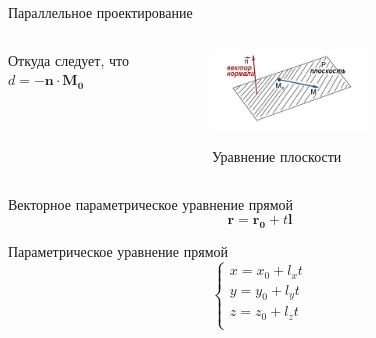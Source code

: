 \documentclass{beamer}
\begin{document}
\begin{frame}{Параллельное проектирование}
{\begin{columns}
\begin{column}{0.5\textwidth}
							Откуда следует, что
							$
								d = - \bm{n} \cdot \bm{M_0}
							$
			\end{column}
			\begin{column}{0.5\textwidth}
				\begin{figure} 
					\href{https://function-x.ru/image/plane_pic01.jpg}{
						\includegraphics[width=0.6\textwidth]{images/plane.jpg}}
					\caption{Уравнение плоскости}
				\end{figure}
			\end{column}
		\end{columns}

			Векторное параметрическое уравнение прямой
			\[
				\bm{r}=\bm{r_0}+t\bm{l}	
			\]
			
			Параметрическое уравнение прямой
			\[
				\begin{cases} x=x_0+l_xt \\
					y=y_0+l_yt \\
					z=z_0+l_zt \\
					\end{cases}
			\]
			}

	\end{frame}
\end{document}
